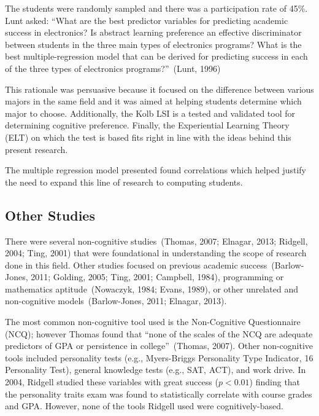 The students were randomly sampled and there was a participation rate of 45\%. Lunt asked: ``What are the best predictor variables for predicting academic success in electronics? Is abstract learning preference an effective discriminator between students in the three main types of electronics programs? What is the best multiple-regression model that can be derived for predicting success in each of the three types of electronics programs?''~(Lunt, 1996)

This rationale was persuasive because it focused on the difference between various majors in the same field and it was aimed at helping students determine which major to choose. Additionally, the Kolb LSI is a tested and validated tool for determining cognitive preference. Finally, the Experiential Learning Theory (ELT) on which the test is based fits right in line with the ideas behind this present research.

The multiple regression model presented found correlations which helped justify the need to expand this line of research to computing students.

\subsection{Other Studies}
There were several non-cognitive studies~(Thomas, 2007; Elnagar, 2013; Ridgell, 2004; Ting, 2001) that were foundational in understanding the scope of research done in this field. Other studies focused on previous academic success~(Barlow-Jones, 2011; Golding, 2005; Ting, 2001; Campbell, 1984), programming or mathematics aptitude~(Nowaczyk, 1984; Evans, 1989), or other unrelated and non-cognitive models~(Barlow-Jones, 2011; Elnagar, 2013).

The most common non-cognitive tool used is the Non-Cognitive Questionnaire (NCQ); however Thomas found that ``none of the scales of the NCQ are adequate predictors of GPA or persistence in college''~(Thomas, 2007). Other non-cognitive tools included personality tests (e.g., Myers-Briggs Personality Type Indicator, 16 Personality Test), general knowledge tests (e.g., SAT, ACT), and work drive. In 2004, Ridgell studied these variables with great success ($p<0.01$) finding that the personality traits exam was found to statistically correlate with course grades and GPA. However, none of the tools Ridgell used were cognitively-based.

